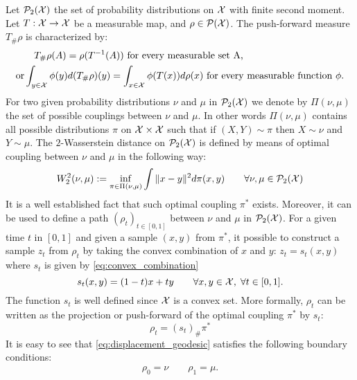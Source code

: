 Let $\mathcal{P}_2({{\mathcal X}})$ the set of probability distributions on ${{\mathcal X}}$ with finite second moment.
Let $T: {{\mathcal X}} \rightarrow {{\mathcal X}}$ be a measurable map, and $\rho \in \mathcal{P}({{\mathcal X}})$. The push-forward measure $T_{\#}\rho$
is characterized by:
\begin{align*}
	&\quad T_{\#}\rho(A) = \rho(T^{-1}(A)) \text{ for every measurable set A,}\\
\text{or}& \int_{y \in {{\mathcal X}}} \phi(y) d(T_{\#}\rho)(y) =\int_{x \in {{\mathcal X}}}\phi(T(x)) d\rho(x) \text{ for every measurable function $\phi$.}
\end{align*}
For two given probability distributions $\nu$ and $\mu$ in $\mathcal{P}_2({{\mathcal X}})$ we denote by $\Pi(\nu,\mu)$ the set of possible couplings between $\nu$ and $\mu$. In other words $\Pi(\nu,\mu)$ contains all possible distributions $\pi$ on ${{\mathcal X}}\times {{\mathcal X}}$ such that if $(X,Y) \sim \pi $ then $X \sim \nu $ and $Y\sim \mu$. The $2$-Wasserstein distance on $\mathcal{P}_2({{\mathcal X}})$ is defined by means of optimal coupling between $\nu$ and $\mu$ in the following way:
\begin{align}\label{eq:wasserstein_2}
W_2^2(\nu,\mu) := \inf_{\pi\in\Pi(\nu,\mu)} \int \Vert x - y\Vert^2 d\pi(x,y) \qquad \forall \nu, \mu\in \mathcal{P}_2({{\mathcal X}})
\end{align}
It is a well established fact that such optimal coupling $\pi^*$ exists. Moreover, it can be used to define a path $(\rho_t)_{t\in [0,1]}$ between $\nu$ and $\mu$ in $\mathcal{P}_2({{\mathcal X}})$. For a given time $t$ in $[0,1]$ and given a sample $(x,y)$ from $\pi^{*}$, it possible to construct a sample $z_t$ from $\rho_t$ by taking the convex combination of $x$ and $y$: $z_t = s_t(x,y)$ where $s_t$ is given by \cref{eq:convex_combination}
\begin{equation}\label{eq:convex_combination}
s_t(x,y) = (1-t)x+ty \qquad \forall x,y\in {{\mathcal X}}, \; \forall t\in [0,1].
\end{equation}
The function $s_t$ is well defined since ${{\mathcal X}}$ is a convex set. More formally, $\rho_t$ can be written as the projection or push-forward of the optimal coupling $\pi^{*}$ by $s_t$:    
\begin{equation}\label{eq:displacement_geodesic}
\rho_t = (s_t)_{\#}\pi^{*}
\end{equation}
It is easy to see that \cref{eq:displacement_geodesic} satisfies the following boundary conditions:
\begin{align}\label{eq:boundary_conditions}
\rho_0 = \nu \qquad \rho_1 = \mu.
\end{align}
